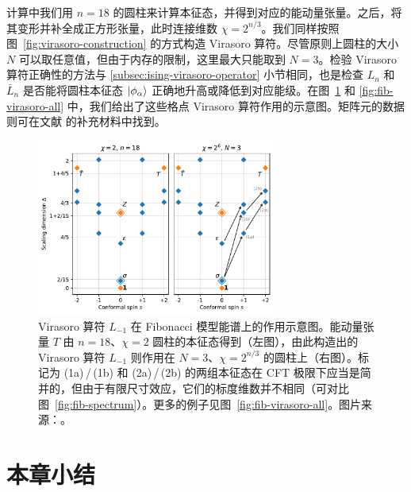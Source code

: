 计算中我们用 $n=18$ 的圆柱来计算本征态，并得到对应的能动量张量。之后，将其变形并补全成正方形张量，此时连接维数 $\chi=2^{n/3}$。我们同样按照图~\ref{fig:virasoro-construction} 的方式构造 Virasoro 算符。尽管原则上圆柱的大小 $N$ 可以取任意值，但由于内存的限制，这里最大只能取到 $N=3$。检验 Virasoro 算符正确性的方法与 \ref{subsec:ising-virasoro-operator} 小节相同，也是检查 $L_n$ 和 $\bar{L}_n$ 是否能将圆柱本征态 $\ket*{\phi_\alpha}$ 正确地升高或降低到对应能级。在图~\ref{fig:fib-virasoro} 和 \ref{fig:fib-virasoro-all} 中，我们给出了这些格点 Virasoro 算符作用的示意图。矩阵元的数据则可在文献 \parencite{zeng2023virasoro} 的补充材料中找到。

\begin{figure}[ht]
  \centering
  \includegraphics[width=0.7\textwidth]{images/fibonacci/fib-virasoro.pdf}
  \caption[Virasoro 算符在 Fibonacci 模型能谱上的作用示意图]{Virasoro 算符 $L_{-1}$ 在 Fibonacci 模型能谱上的作用示意图。能动量张量 $T$ 由 $n=18$、$\chi=2$ 圆柱的本征态得到（左图），由此构造出的 Virasoro 算符 $L_{-1}$ 则作用在 $N=3$、$\chi=2^{n/3}$ 的圆柱上（右图）。标记为 (1a)\,/\,(1b) 和 (2a)\,/\,(2b) 的两组本征态在 CFT 极限下应当是简并的，但由于有限尺寸效应，它们的标度维数并不相同（可对比图~\ref{fig:fib-spectrum}）。更多的例子见图~\ref{fig:fib-virasoro-all}。图片来源：\parencite{zeng2023virasoro}。}
  \label{fig:fib-virasoro}
\end{figure}

\section{本章小结}
